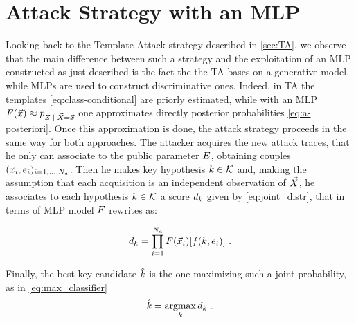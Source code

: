 \section{Attack Strategy with an MLP}
Looking back to the Template Attack strategy described in \ref{sec:TA}, we observe that the main difference between such a strategy and the exploitation of an MLP constructed as just described is the fact the the TA bases on a generative model, while MLPs are used to construct discriminative ones. Indeed, in TA the templates \eqref{eq:class-conditional} are priorly estimated, while with an MLP $\MLmodel(\vLeakVec) \approx \pdf_{\given{\sensRandVar}{\vaLeakVec=\vLeakVec}}$ one approximates directly posterior probabilities \eqref{eq:a-posteriori}. Once this approximation is done, the attack strategy proceeds in the same way for both approaches. The attacker acquires the new attack traces, that he only can associate to the public parameter $E$, obtaining couples  $(\vec{x}_i, e_i)_{i=1, \dots , N_a}$. Then he makes key hypothesis $k \in \mathcal{K}$ and, making the assumption that each acquisition is an independent observation of $\vec{X}$, he associates to each hypothesis $k \in \mathcal{K}$ a score $d_k$ given by \eqref{eq:joint_distr}, that in terms of MLP model $F$ rewrites  as:

\begin{equation}\label{eq:NN_SCA}
d_{k} = \prod_{i=1}^{N_a} F(\vec{x}_i)[f(k,e_i)] \mbox{ .}
\end{equation}

Finally, the best key candidate $\hat{k}$ is the one maximizing such a joint probability, as in \eqref{eq:max_classifier}
\begin{equation}
\hat{k} = \operatorname*{argmax}_{k} d_{k} \mbox{ .}
\end{equation}








